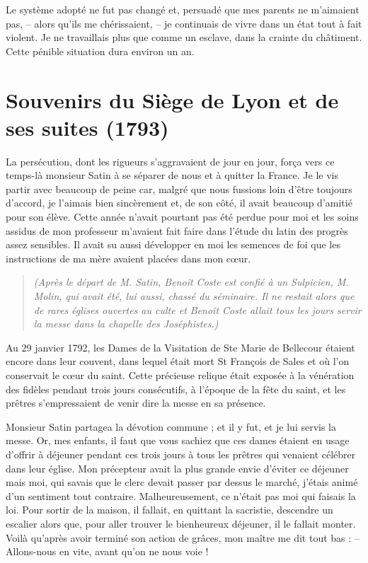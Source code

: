 \documentclass[11pt,a4paper]{report}
\begin{document}
Le système adopté ne fut pas changé et, persuadé que mes parents ne m'aimaient pas, -- alors qu'ils me chérissaient, -- je continuais de vivre dans un état tout à fait violent. Je ne travaillais plus que comme un esclave, dans la crainte du châtiment. Cette pénible situation dura environ un an.

\chapter{Souvenirs du Siège de Lyon et de ses suites (1793)}

La persécution, dont les rigueurs s'aggravaient de jour en jour, força vers ce temps-là monsieur Satin à se séparer de nous et à quitter la France. Je le vis partir avec beaucoup de peine car, malgré que nous fussions loin d'être toujours d'accord, je l'aimais bien sincèrement et, de son côté, il avait beaucoup d'amitié pour son élève. Cette année n'avait pourtant pas été perdue pour moi et les soins assidus de mon professeur m'avaient fait faire dans l'étude du latin des progrès assez sensibles. Il avait su aussi développer en moi les semences de foi que les instructions de ma mère avaient placées dans mon cœur.

\begin{quote}
\textit{(Après le départ de M. Satin, Benoît Coste est confié à un Sulpicien, M. Molin, qui avait été, lui aussi, chassé du séminaire. Il ne restait alors que de rares églises ouvertes au culte et Benoît Coste allait tous les jours servir la messe dans la chapelle des Joséphistes.)}
\end{quote}

Au 29 janvier 1792, les Dames de la Visitation de Ste Marie de Bellecour étaient encore dans leur couvent, dans lequel était mort St François de Sales et où l'on conservait le cœur du saint. Cette précieuse relique était exposée à la vénération des fidèles pendant trois jours consécutifs, à l'époque de la fête du saint, et les prêtres s'empressaient de venir dire la messe en sa présence.

Monsieur Satin partagea la dévotion commune ; et il y fut, et je lui servis la messe. Or, mes enfants, il faut que vous sachiez que ces dames étaient en usage d'offrir à déjeuner pendant ces trois jours à tous les prêtres qui venaient célébrer dans leur église. Mon précepteur avait la plus grande envie d'éviter ce déjeuner mais moi, qui savais que le clerc devait passer par dessus le marché, j'étais animé d'un sentiment tout contraire. Malheureusement, ce n'était pas moi qui faisais la loi. Pour sortir de la maison, il fallait, en quittant la sacristie, descendre un escalier alors que, pour aller trouver le bienheureux déjeuner, il le fallait monter. Voilà qu'après avoir terminé son action de grâces, mon maître me dit tout bas :
-- Allons-nous en vite, avant qu'on ne nous voie !
\end{document}
